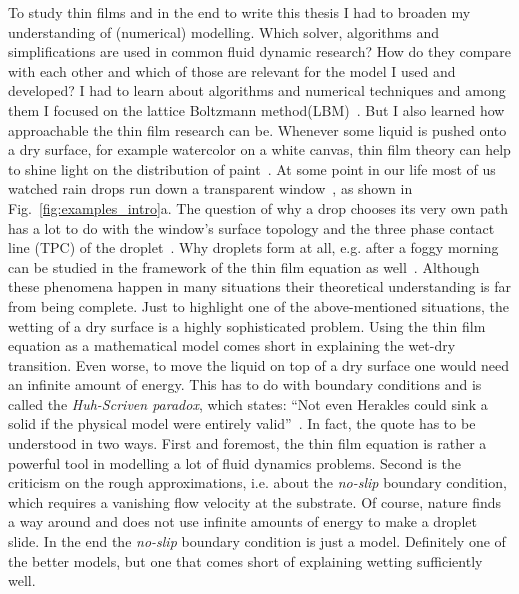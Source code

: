 To study thin films and in the end to write this thesis I had to broaden my understanding of (numerical) modelling. 
Which solver, algorithms and simplifications are used in common fluid dynamic research?
How do they compare with each other and which of those are relevant for the model I used and developed? 
I had to learn about algorithms and numerical techniques and among them I focused on the lattice Boltzmann method(LBM)~\cite{chenLatticeBoltzmannMethod1998, heTheoryLatticeBoltzmann1997, guoDiscreteLatticeEffects2002, krugerLatticeBoltzmannMethod2017}.
But I also learned how approachable the thin film research can be. 
Whenever some liquid is pushed onto a dry surface, for example watercolor on a white canvas, thin film theory can help to shine light on the distribution of paint~\cite{thielePatternedDepositionMoving2014, oronLongscaleEvolutionThin1997, edwardsNotSpreadingReverse2016}. 
At some point in our life most of us watched rain drops run down a transparent window~\cite{wilczekSlidingDropsEnsemble2017}, as shown in Fig.~\ref{fig:examples_intro}a. 
The question of why a drop chooses its very own path has a lot to do with the window's surface topology and the three phase contact line (TPC) of the droplet~\cite{cassieWettabilityPorousSurfaces1944, suzukiSlidingBehaviorWater2008, liuActuatingWaterDroplets2015}. 
Why droplets form at all, e.g.  after a foggy morning can be studied in the framework of the thin film equation as well~\cite{zhangInkjetPrintingDirect2015, shiFogHarvestingHarps2018}.
Although these phenomena happen in many situations their theoretical understanding is far from being complete.
Just to highlight one of the above-mentioned situations, the wetting of a dry surface is a highly sophisticated problem.
Using the thin film equation as a mathematical model comes short in explaining the wet-dry transition.
Even worse, to move the liquid on top of a dry surface one would need an infinite amount of energy.
This has to do with boundary conditions and is called the \textit{Huh-Scriven paradox}, which states: ``Not even Herakles could sink a solid if the physical model were entirely valid''~\cite{huhHydrodynamicModelSteady1971}.
In fact, the quote has to be understood in two ways. 
First and foremost, the thin film equation is rather a powerful tool in modelling a lot of fluid dynamics problems.
Second is the criticism on the rough approximations, i.e. about the \textit{no-slip} boundary condition, which requires a vanishing flow velocity at the substrate.
Of course, nature finds a way around and does not use infinite amounts of energy to make a droplet slide. 
In the end the \textit{no-slip} boundary condition is just a model.
Definitely one of the better models, but one that comes short of explaining wetting sufficiently well.

